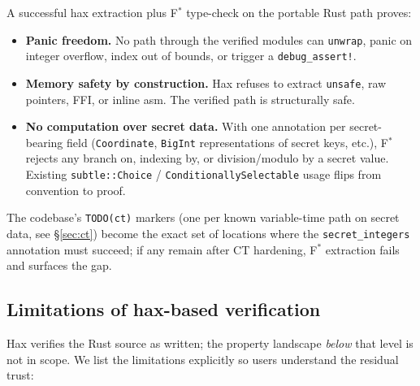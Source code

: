 A successful hax extraction plus F$^*$ type-check on the portable
Rust path proves:
\begin{itemize}[nosep]
  \item \textbf{Panic freedom.}  No path through the verified
        modules can \texttt{unwrap}, panic on integer overflow,
        index out of bounds, or trigger a \texttt{debug\_assert!}.
  \item \textbf{Memory safety by construction.}  Hax refuses to
        extract \texttt{unsafe}, raw pointers, FFI, or inline asm.
        The verified path is structurally safe.
  \item \textbf{No computation over secret data.}  With one
        annotation per secret-bearing field
        (\texttt{Coordinate}, \texttt{BigInt} representations of
        secret keys, etc.), F$^*$ rejects any branch on, indexing
        by, or division/modulo by a secret value.  Existing
        \texttt{subtle::Choice} / \texttt{ConditionallySelectable}
        usage flips from convention to proof.
\end{itemize}

The codebase's \texttt{TODO(ct)} markers (one per known
variable-time path on secret data, see \S\ref{sec:ct}) become the
exact set of locations where the \texttt{secret\_integers}
annotation must succeed; if any remain after CT hardening, F$^*$
extraction fails and surfaces the gap.

\subsection{Limitations of hax-based verification}

Hax verifies the Rust source as written; the property landscape
\emph{below} that level is not in scope.  We list the limitations
explicitly so users understand the residual trust:


